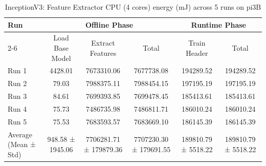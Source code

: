 \begin{table}[t]
\centering
\caption{InceptionV3: Feature Extractor CPU (4 cores) energy (mJ) across 5 runs on pi3B}
\label{tab:energy_inceptionv3_CPU4_pi3B}
\begin{tabular}{lccccc}
\hline
\multirow{2}{*}{Run} & \multicolumn{3}{c}{Offline Phase} & \multicolumn{2}{c}{Runtime Phase} \\
\cline{2-6}
 & Load Base Model & Extract Features & Total & Train Header & Total \\
\hline
  Run 1                  & 4428.01        & 7673310.06     & 7677738.08     & 194289.52      & 194289.52      \\
  Run 2                  & 79.03          & 7988375.11     & 7988454.15     & 197195.19      & 197195.19      \\
  Run 3                  & 84.61          & 7699393.85     & 7699478.45     & 185413.61      & 185413.61      \\
  Run 4                  & 75.73          & 7486735.98     & 7486811.71     & 186010.24      & 186010.24      \\
  Run 5                  & 75.53          & 7683593.57     & 7683669.10     & 186145.39      & 186145.39      \\
\hline
  Average (Mean ± Std)   & 948.58 ± 1945.06 & 7706281.71 ± 179879.36 & 7707230.30 ± 179691.55 & 189810.79 ± 5518.22 & 189810.79 ± 5518.22 \\
\hline
\end{tabular}
\end{table}
